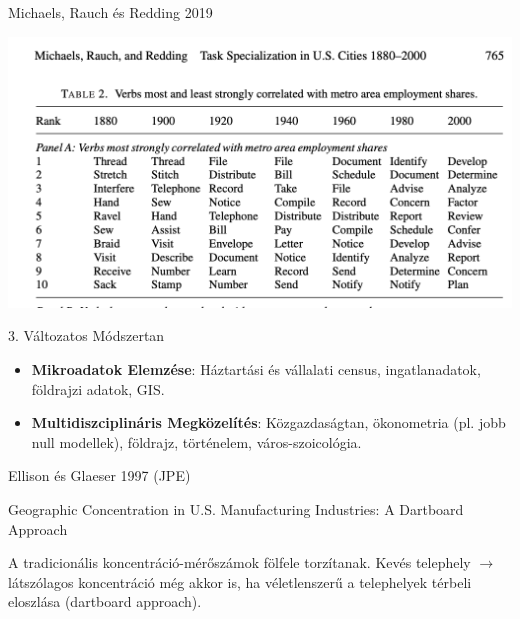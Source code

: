 \documentclass[ignorenonframetext,aspectratio=54,]{beamer}
\providecommand{\tightlist}{%
  \setlength{\itemsep}{0pt}\setlength{\parskip}{0pt}}
\begin{document}
\begin{frame}{Michaels, Rauch és Redding 2019}
\protect\hypertarget{michaels-rauch-uxe9s-redding-2019}{}

\includegraphics{michaels2019.png}

\end{frame}

\begin{frame}{3. Változatos Módszertan}
\protect\hypertarget{vuxe1ltozatos-muxf3dszertan}{}

\begin{itemize}
\tightlist
\item
  \textbf{Mikroadatok Elemzése}: Háztartási és vállalati census,
  ingatlanadatok, földrajzi adatok, GIS.
\item
  \textbf{Multidiszciplináris Megközelítés}: Közgazdaságtan, ökonometria
  (pl. jobb null modellek), földrajz, történelem, város-szoicológia.
\end{itemize}

\end{frame}

\begin{frame}{Ellison és Glaeser 1997 (JPE)}
\protect\hypertarget{ellison-uxe9s-glaeser-1997-jpe}{}

Geographic Concentration in U.S. Manufacturing Industries: A Dartboard
Approach

A tradicionális koncentráció-mérőszámok fölfele torzítanak. Kevés
telephely \(\to\) látszólagos koncentráció még akkor is, ha
véletlenszerű a telephelyek térbeli eloszlása (dartboard approach).

\end{frame}
\end{document}
